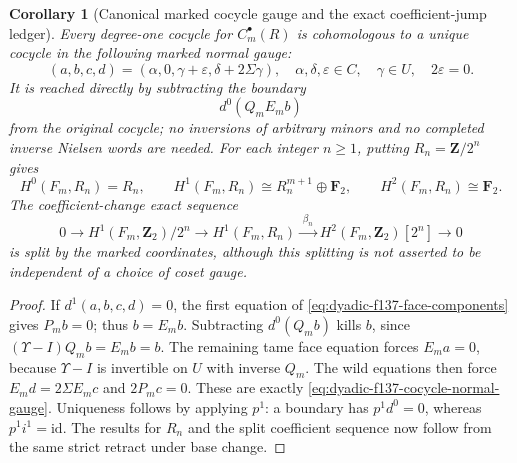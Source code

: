 \documentclass[11pt]{article}
\newtheorem{corollary}[theorem]{Corollary}
\theoremstyle{definition}
\begin{document}
\begin{corollary}[Canonical marked cocycle gauge and the exact
coefficient-jump ledger]
\label{cor:dyadic-f137-cocycle-gauge}
Every degree-one cocycle for $C^\bullet_m(R)$
is cohomologous to a \emph{unique} cocycle
in the following marked normal gauge:
\begin{equation}\label{eq:dyadic-f137-cocycle-normal-gauge}
\boxed{
(a,b,c,d)=
(\alpha,0,\gamma+\varepsilon,
             \delta+2\Sigma\gamma),
\quad
\alpha,\delta,\varepsilon\in C,\quad
\gamma\in U,\quad 2\varepsilon=0 .
}
\end{equation}
It is reached directly by subtracting the boundary
\[
d^0(Q_mE_mb)
\]
from the original cocycle; no inversions of
arbitrary minors and no completed inverse
Nielsen words are needed.
For each integer $n\ge1$, putting
$R_n=\mathbf Z/2^n$ gives
\begin{equation}\label{eq:dyadic-f137-modn-cohomology}
\boxed{
H^0(F_m,R_n)=R_n,\qquad
H^1(F_m,R_n)\cong R_n^{m+1}\oplus\mathbf F_2,
\qquad
H^2(F_m,R_n)\cong\mathbf F_2 .
}
\end{equation}
The coefficient-change exact sequence
\begin{equation}\label{eq:dyadic-f137-uct-bockstein}
0\longrightarrow
H^1(F_m,\mathbf Z_2)/2^n
\longrightarrow H^1(F_m,R_n)
\xrightarrow{\;\beta_n\;}
H^2(F_m,\mathbf Z_2)[2^n]
\longrightarrow0
\end{equation}
is split by the marked coordinates,
although this splitting is
\emph{not} asserted to be independent
of a choice of coset gauge.
\end{corollary}

\begin{proof}
If $d^1(a,b,c,d)=0$, the first equation
of \eqref{eq:dyadic-f137-face-components}
gives $P_mb=0$; thus $b=E_mb$.
Subtracting $d^0(Q_mb)$ kills $b$, since
$(\Upsilon-I)Q_mb=E_mb=b$.
The remaining tame face equation
forces $E_ma=0$, because
$\Upsilon-I$ is invertible on $U$
with inverse $Q_m$.  The wild equations
then force $E_md=2\Sigma E_mc$
and $2P_mc=0$.  These are exactly
\eqref{eq:dyadic-f137-cocycle-normal-gauge}.
Uniqueness follows by applying $p^1$:
a boundary has $p^1d^0=0$,
whereas $p^1i^1=\mathrm{id}$.
The results for $R_n$ and the split
coefficient sequence now follow from the
same strict retract under base change.
\end{proof}
\end{document}
